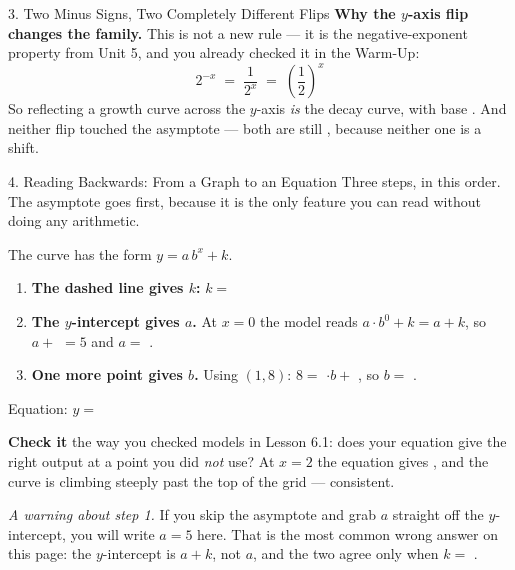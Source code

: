 \documentclass[10pt]{article}
\newcommand{\lgrid}[4]{%
  \draw[step=1, linegray!40, very thin] (#1,#3) grid (#2,#4);
  \draw[->, semithick, charcoal] (#1,0)--(#2,0) node[below right, font=\scriptsize]{$x$};
  \draw[->, semithick, charcoal] (0,#3)--(0,#4) node[left, font=\scriptsize]{$y$};}
\newcommand{\expgraph}[6]{\draw[very thick, forest, domain=#5:#6, samples=140, smooth]
  plot (\x,{(#1)*exp((#2)*((\x)-(#3)))+(#4)});}
\newcommand{\hasym}[3]{\draw[navy, dashed, semithick] (#1,#3)--(#2,#3);}
\begin{document}
\begin{notesbox}{3. Two Minus Signs, Two Completely Different Flips}
\vspace{2pt}
\textbf{Why the $y$-axis flip changes the family.} This is not a new rule --- it is the
negative-exponent property from Unit 5, and you already checked it in the Warm-Up:
\[
  2^{-x} \;=\; \frac{1}{2^{x}} \;=\; \left(\frac{1}{2}\right)^{x}
\]
So reflecting a growth curve across the $y$-axis \emph{is} the decay curve, with base
. And neither flip touched the asymptote --- both are still , because
neither one is a  shift.
\end{notesbox}

\begin{notesbox}{4. Reading Backwards: From a Graph to an Equation}
Three steps, in this order. The asymptote goes first, because it is the only feature you can read
without doing any arithmetic.
\begin{center}
\begin{minipage}[c]{0.44\linewidth}
\centering
{}
\end{minipage}
\begin{minipage}[c]{0.52\linewidth}
\small
The curve has the form $y=a\,b^{x}+k$.
\begin{enumerate}[leftmargin=1.6em, itemsep=4pt]
  \item \textbf{The dashed line gives $k$:} \; $k=$ 
  \item \textbf{The $y$-intercept gives $a$.} At $x=0$ the model reads $a\cdot b^{0}+k = a+k$, so
        $a+$  $=5$ and $a=$ .
  \item \textbf{One more point gives $b$.} Using $(1,8)$: \; $8=$ $\cdot b+$
        , so $b=$ .
\end{enumerate}
Equation: $y=$ 
\end{minipage}
\end{center}

\vspace{2pt}
\textbf{Check it} the way you checked models in Lesson 6.1: does your equation give the right output
at a point you did \emph{not} use? At $x=2$ the equation gives , and the curve is
climbing steeply past the top of the grid --- consistent.

\vspace{3pt}
\emph{A warning about step 1.} If you skip the asymptote and grab $a$ straight off the $y$-intercept,
you will write $a=5$ here. That is the most common wrong answer on this page: the $y$-intercept is
$a+k$, not $a$, and the two agree only when $k=$ .
\end{notesbox}
\end{document}
